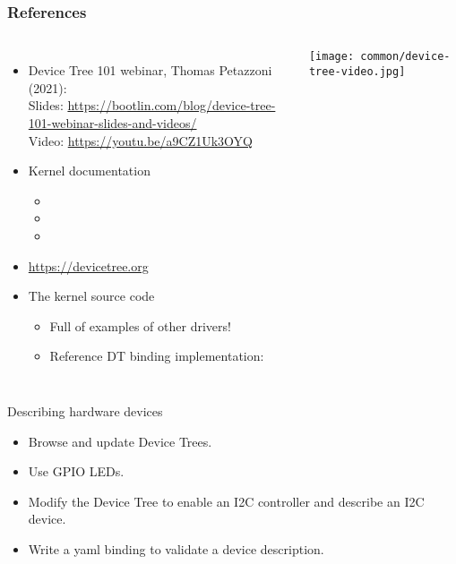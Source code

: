 \begin{frame}
  \frametitle{References}
  \begin{columns}
       \begin{itemize}
       \item Device Tree 101 webinar, Thomas Petazzoni (2021):\\
	     Slides: \url{https://bootlin.com/blog/device-tree-101-webinar-slides-and-videos/}\\
	     Video: \url{https://youtu.be/a9CZ1Uk3OYQ}
       \item Kernel documentation
         \begin{itemize}
         \item {}
         \item {}
         \item {}
         \end{itemize}
      \item \url{https://devicetree.org}
       \item The kernel source code
         \begin{itemize}
         \item Full of examples of other drivers!
         \item Reference DT binding implementation:
         \end{itemize}
       \end{itemize}
    \texttt{[image: common/device-tree-video.jpg]}
  \end{columns}
\end{frame}

\setuplabframe
{Describing hardware devices}
{
  \begin{itemize}
  \item Browse and update Device Trees.
  \item Use GPIO LEDs.
  \item Modify the Device Tree to enable an I2C controller and describe
    an I2C device.
  \item Write a yaml binding to validate a device description.

  \end{itemize}
}
